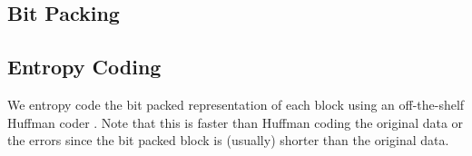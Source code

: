 



\subsection{Bit Packing}

\subsection{Entropy Coding}

We entropy code the bit packed representation of each block using an off-the-shelf Huffman coder \cite{fse}. Note that this is faster than Huffman coding the original data or the errors since the bit packed block is (usually) shorter than the original data.


